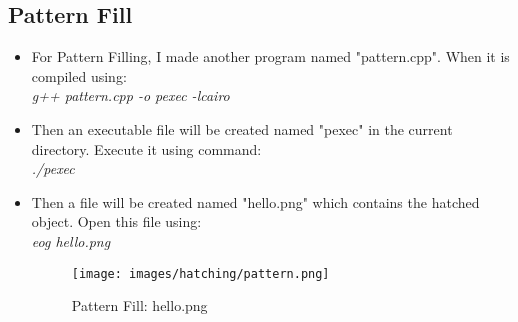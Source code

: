 \subsection{Pattern Fill}
\begin{itemize}
\item For Pattern Filling, I made another program named "pattern.cpp". When it is compiled using:\\
\textit{g++ pattern.cpp -o pexec -lcairo}
\item Then an executable file will be created named "pexec" in the current directory. Execute it using command:\\
\textit{./pexec}
\item Then a file will be created named "hello.png" which contains the hatched object.
Open this file using: \\
\textit{eog hello.png}
\begin{figure}[!ht]
\centering
\texttt{[image: images/hatching/pattern.png]}                   
\vspace{-1em}
\caption{Pattern Fill: hello.png}
\hspace{-1.5em}
\end{figure}

\end{itemize}